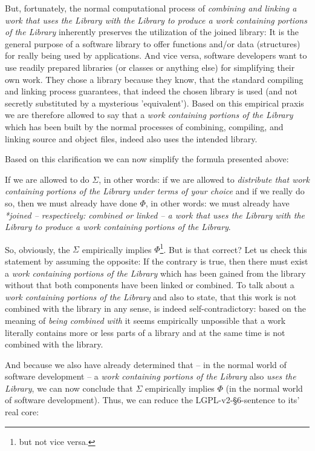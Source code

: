 But, fortunately, the normal computational process of \emph{combining and
linking a work that uses the Library with the Library to produce a work
containing portions of the Library} inherently preserves the utilization of the
joined library: It is the general purpose of a software library to offer
functions and/or data (structures) for really being used by applications. And
vice versa, software developers want to use readily prepared libraries (or
classes or anything else) for simplifying their own work. They chose a library
because they know, that the standard compiling and linking process guarantees,
that indeed the chosen library is used (and not secretly substituted by a
mysterious 'equivalent'). Based on this empirical praxis we are therefore
allowed to say that a \emph{work containing portions of the Library}
which has been built by the normal processes of combining, compiling, and
linking source and object files, indeed also uses the intended library.

Based on this clarification we can now simplify the formula presented above:

If we are allowed to do $\Sigma$, in other words: if we are allowed to
\emph{distribute that work containing portions of the Library under terms of
your choice} and if we really do so, then we must already have done $\Phi$, in
other words: we must already have \emph{*joined -- respectively: combined or
linked -- a work that uses the Library with the Library to produce a work
containing portions of the Library}.

So, obviously, the $\Sigma$ empirically implies $\Phi$\footnote{but not vice
versa.}. But is that correct? Let us check this statement by assuming the
opposite: If the contrary is true, then there must exist a \emph{work containing
portions of the Library} which has been gained from the library without that both
components have been linked or combined. To talk about a \emph{work containing
portions of the Library} and also to state, that this work is not combined with
the library in any sense, is indeed self-contradictory: based on the meaning of
\emph{being combined with} it seems empirically unpossible that a work literally
contains more or less parts of a library and at the same time is not combined
with the library.

And because we also have already determined that -- in the normal world of
software development -- a \emph{work containing portions of the Library} also
\emph{uses the Library}, we can now conclude that $\Sigma$ empirically implies
$\Phi$ (in the normal world of software development). Thus, we can reduce
the LGPL-v2-§6-sentence to its' real core:

